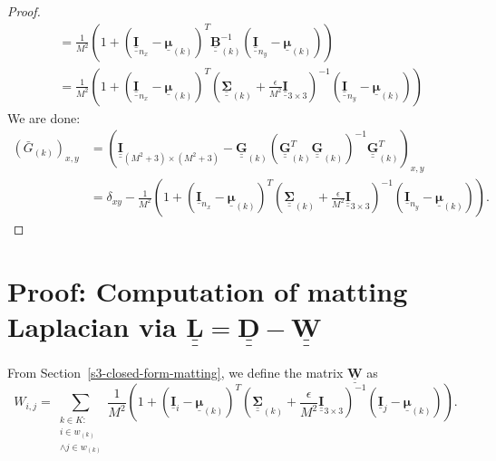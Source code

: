 \documentclass{article}
\def\vt#1{\underline{\mathbf{#1}}}
\def\vts#1{\underline{\boldsymbol{#1}}}
\def\mt#1{\underline{\underline{\mathbf{#1}}}}
\def\mts#1{\underline{\underline{\boldsymbol{#1}}}}
\begin{document}
\begin{lemma}
\begin{proof}
\begin{align*}
            &= \frac1{M^2} \left(1 + \left(\mt I_{n_x} - \vts \mu_{(k)}\right)^T \mt B_{(k)}^{-1} \left(\mt I_{n_y} - \vts \mu_{(k)}\right)\right)\\
            &= \frac1{M^2} \left(1 + \left(\mt I_{n_x} - \vts \mu_{(k)}\right)^T \left(\mts \Sigma_{(k)}+\frac\epsilon{M^2}\mt I_{3\times 3}\right)^{-1} \left(\mt I_{n_y} - \vts \mu_{(k)}\right)\right)
        \end{align*}
        We are done:
        \begin{align*}
            \left({\bar{G}}_{(k)}\right)_{x,y} &= \left(\mt I_{(M^2+3)\times(M^2+3)} - \mt G_{(k)} \left(\mt G_{(k)}^T \mt G_{(k)}\right)^{-1} \mt G_{(k)}^T\right)_{x,y} \\
            &= \delta_{xy} - \frac1{M^2}\left(1 + \left(\vt{I}_{n_x} - \vts \mu_{(k)}\right)^T \left(\mts \Sigma_{(k)} + \frac\epsilon{M^2} \mt{I}_{3\times 3}\right)^{-1} \left(\vt{I}_{n_y} - \vts \mu_{(k)}\right) \right).
        \end{align*}
    \end{proof}
\end{lemma}



\section{Proof: Computation of matting Laplacian via $\mt L = \mt D - \mt W$} \label{appendix:w-sum-zero-proof}
From Section~\ref{s3-closed-form-matting}, we define the matrix $\mt W$ as
$$ W_{i,j} = \sum_{\substack{k\in K:\\i\in w_{(k)}\\\wedge j\in w_{(k)}}} \frac1{M^2}\left(1 + \left(\vt{I}_i - \vts \mu_{(k)}\right)^T \left(\mts \Sigma_{(k)} + \frac\epsilon{M^2} \mt{I}_{3\times 3}\right)^{-1} \left(\vt{I}_j - \vts \mu_{(k)}\right) \right). $$
\end{document}
